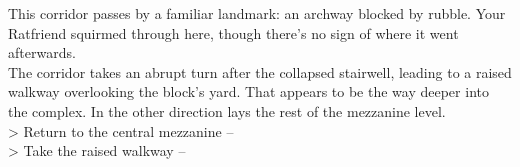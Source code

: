 This corridor passes by a familiar landmark: an archway blocked by rubble. Your Ratfriend squirmed through here, though there’s no sign of where it went afterwards.\\

The corridor takes an abrupt turn after the collapsed stairwell, leading to a raised walkway overlooking the block’s yard. That appears to be the way deeper into the complex. In the other direction lays the rest of the mezzanine level.\\

> Return to the central mezzanine -- \\
> Take the raised walkway -- 